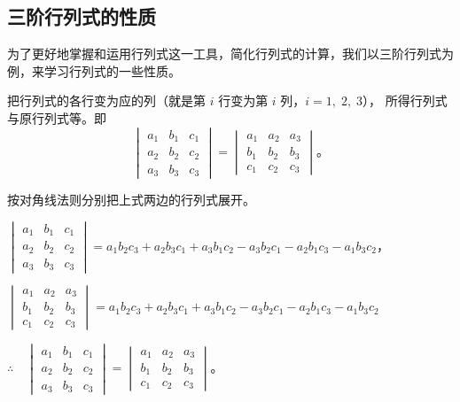\subsection{三阶行列式的性质}\label{subsec:4-3}

为了更好地掌握和运用行列式这一工具，简化行列式的计算，我们以三阶行列式为例，来学习行列式的一些性质。

\begin{theorem} \label{theorem:sjhls-1}
    把行列式的各行变为应的列（就是第 $i$ 行变为第 $i$ 列，$i = 1,\; 2,\; 3$）， 所得行列式与原行列式等。即
    $$
    \begin{vmatrix*}
        a_1 & b_1 & c_1 \\
        a_2 & b_2 & c_2 \\
        a_3 & b_3 & c_3
    \end{vmatrix*}
    =
    \begin{vmatrix*}
        a_1 & a_2 & a_3 \\
        b_1 & b_2 & b_3 \\
        c_1 & c_2 & c_3
    \end{vmatrix*} \text{。}
    $$
\end{theorem}


\zhengming 按对角线法则分别把上式两边的行列式展开。

$\begin{vmatrix*}
    a_1 & b_1 & c_1 \\
    a_2 & b_2 & c_2 \\
    a_3 & b_3 & c_3
\end{vmatrix*} = a_1b_2c_3 + a_2b_3c_1 + a_3b_1c_2 - a_3b_2c_1 - a_2b_1c_3 - a_1b_3c_2$，

$\begin{vmatrix*}
    a_1 & a_2 & a_3 \\
    b_1 & b_2 & b_3 \\
    c_1 & c_2 & c_3
\end{vmatrix*} = a_1b_2c_3 + a_2b_3c_1 + a_3b_1c_2 - a_3b_2c_1 - a_2b_1c_3 - a_1b_3c_2$

$\therefore \quad
\begin{vmatrix*}
    a_1 & b_1 & c_1 \\
    a_2 & b_2 & c_2 \\
    a_3 & b_3 & c_3
\end{vmatrix*}
=
\begin{vmatrix*}
    a_1 & a_2 & a_3 \\
    b_1 & b_2 & b_3 \\
    c_1 & c_2 & c_3
\end{vmatrix*} \text{。}$

